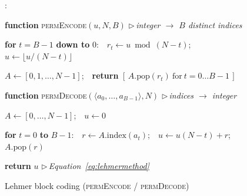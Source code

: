 \documentclass[10pt,a4paper]{article}
\theoremstyle{definition}
\newcounter{algln}
\begin{document}
\begin{figure}[t]\captionsetup{type=algorithm}
\caption{Lehmer block coding (\textsc{permEncode} / \textsc{permDecode})}\label{alg:lehmer}
\begin{list}{\footnotesize{}:}{%
    \setlength{\leftmargin}{2.4em}\setlength{\labelwidth}{1.7em}%
    \setlength{\labelsep}{0.4em}\setlength{\itemsep}{1.5pt}%
    \setlength{\parsep}{0pt}\setlength{\topsep}{3pt}\small}
\item \textbf{function} \textsc{permEncode}$(u,N,B)$ \hfill{\footnotesize$\triangleright$\,\textit{integer $\to$ $B$ distinct indices}}
\item \hspace*{1.3em} \textbf{for} $t=B-1$ \textbf{down to} $0$:\ \ $r_t\gets u\bmod(N-t)$;\ \ $u\gets\lfloor u/(N-t)\rfloor$
\item \hspace*{1.3em} $A\gets[0,1,\dots,N-1]$;\ \ \textbf{return} $[\,A.\text{pop}(r_t)\ \text{for}\ t=0\dots B-1\,]$
\item \textbf{function} \textsc{permDecode}$(\langle a_0,\dots,a_{B-1}\rangle,N)$ \hfill{\footnotesize$\triangleright$\,\textit{indices $\to$ integer}}
\item \hspace*{1.3em} $A\gets[0,\dots,N-1]$;\ \ $u\gets0$
\item \hspace*{1.3em} \textbf{for} $t=0$ \textbf{to} $B-1$:\ \ $r\gets A.\text{index}(a_t)$;\ \ $u\gets u(N-t)+r$;\ \ $A.\text{pop}(r)$
\item \hspace*{1.3em} \textbf{return} $u$ \hfill{\footnotesize$\triangleright$\,\textit{Equation~\eqref{eq:lehmermethod}}}
\end{list}
\end{figure}
\end{document}
